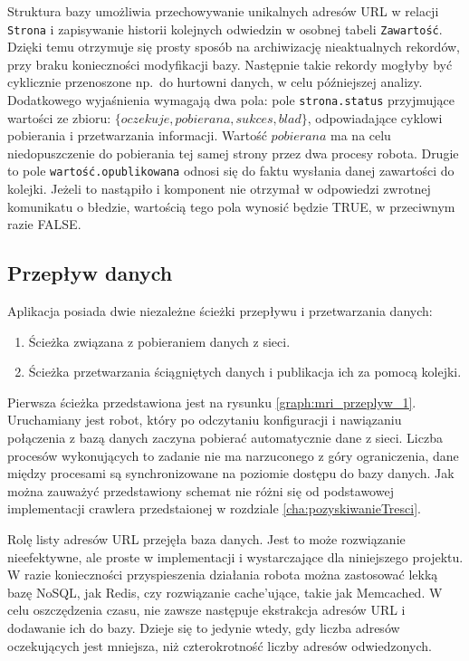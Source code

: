 Struktura bazy umożliwia przechowywanie unikalnych adresów URL w relacji \texttt{Strona} i zapisywanie historii kolejnych odwiedzin w osobnej tabeli \texttt{Zawartość}. Dzięki
temu otrzymuje się prosty sposób na archiwizację nieaktualnych rekordów, przy braku konieczności modyfikacji bazy. Następnie takie rekordy mogłyby być cyklicznie przenoszone 
np.~do hurtowni danych, w celu późniejszej analizy. Dodatkowego wyjaśnienia wymagają dwa pola: pole \texttt{strona.status} przyjmujące wartości ze zbioru: 
$\{oczekuje, pobierana, sukces, blad\}$, odpowiadające cyklowi pobierania i przetwarzania informacji. Wartość $pobierana$ ma na celu niedopuszczenie do pobierania tej samej
strony przez dwa procesy robota. Drugie to pole \texttt{wartość.opublikowana} odnosi się do faktu wysłania danej zawartości do kolejki. Jeżeli to nastąpiło i komponent nie otrzymał
w odpowiedzi zwrotnej komunikatu o błedzie, wartością tego pola wynosić będzie TRUE, w przeciwnym razie FALSE.

\subsection{Przepływ danych}
\label{subs:mriPrzepDanych}

Aplikacja posiada dwie niezależne ścieżki przepływu i przetwarzania danych:
\begin{enumerate}
\item Ścieżka związana z pobieraniem danych z sieci.
\item Ścieżka przetwarzania ściągniętych danych i publikacja ich za pomocą kolejki.
\end{enumerate}

Pierwsza ścieżka przedstawiona jest na rysunku \ref{graph:mri_przeplyw_1}. Uruchamiany jest robot, który po odczytaniu konfiguracji i nawiązaniu połączenia z bazą danych zaczyna pobierać
automatycznie dane z sieci.  Liczba procesów wykonujących to zadanie nie ma narzuconego z góry ograniczenia, dane między procesami są synchronizowane na poziomie dostępu do bazy danych.
Jak można zauważyć przedstawiony schemat nie różni się od podstawowej implementacji crawlera przedstaionej w rozdziale \ref{cha:pozyskiwanieTresci}.

Rolę listy adresów URL przejęła baza danych. Jest to może rozwiązanie nieefektywne, ale proste w implementacji i wystarczające dla niniejszego projektu.
W razie konieczności przyspieszenia działania robota można zastosować lekką bazę NoSQL, jak Redis, czy rozwiązanie cache'ujące, takie jak Memcached.
W celu oszczędzenia czasu, nie zawsze następuje ekstrakcja adresów URL i dodawanie ich do bazy. Dzieje się to jedynie wtedy, gdy liczba adresów oczekujących
jest mniejsza, niż czterokrotność liczby adresów odwiedzonych. 

